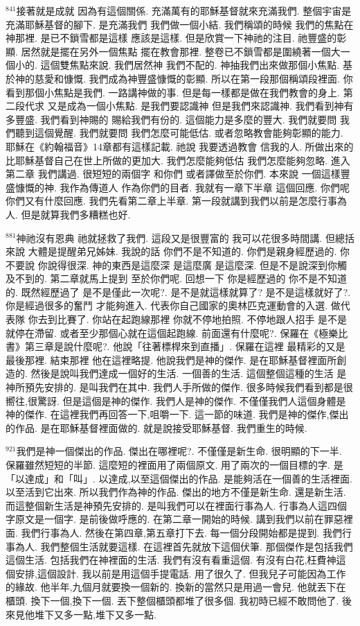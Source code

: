 \documentclass{book}
\begin{document}
$^{841}$接著就是成就 因為有這個關係.
充滿萬有的耶穌基督就來充滿我們.
整個宇宙是充滿耶穌基督的腳下.
是充滿我們 我們做一個小結.
我們稱頌的時候 我們的焦點在神那裡.
是已不鎖雪都是這樣 應該是這樣.
但是欣賞一下神祂的注目.
祂豐盛的彰顯.
居然就是擺在另外一個焦點 擺在教會那裡.
整卷已不鎖雪都是圍繞著一個大一個小的.
這個雙焦點來說.
我們居然神 我們不配的.
神抽我們出來做那個小焦點.
基於神的慈愛和慷慨.
我們成為神豐盛慷慨的彰顯.
所以在第一段那個稱頌段裡面.
你看到那個小焦點是我們.
一路講神做的事.
但是每一樣都是做在我們教會的身上.
第二段代求 又是成為一個小焦點.
是我們要認識神 但是我們來認識神.
我們看到神有多豐盛.
我們看到神賜的 賜給我們有份的.
這個能力是多麼的豐大.
我們就要問 我們聽到這個覺醒.
我們就要問 我們怎麼可能低估.
或者忽略教會能夠彰顯的能力.
耶穌在《約翰福音》14章都有這樣記載.
祂說 我要透過教會 信我的人.
所做出來的 比耶穌基督自己在世上所做的更加大.
我們怎麼能夠低估 我們怎麼能夠忽略.
進入第二章 我們講過.
很短短的兩個字 和你們 或者譯做至於你們.
本來說 一個這樣豐盛慷慨的神.
我作為傳道人 作為你們的目者.
我就有一章下半章 這個回應.
你們呢 你們又有什麼回應.
我們先看第二章上半章.
第一段就講到我們以前是怎麼行事為人.
但是就算我們多糟糕也好.

$^{881}$神祂沒有恩典 祂就拯救了我們.
這段又是很豐富的 我可以花很多時間講.
但總括來說 大體是提醒弟兄姊妹.
我說的話 你們不是不知道的.
你們是親身經歷過的.
你不要說 你說得很深.
神的東西是這麼深 是這麼廣 是這麼深.
但是不是說深到你觸及不到的.
第二章就馬上提到 至於你們呢.
回想一下 你是經歷過的 你不是不知道的.
既然經歷過了 是不是僅此一次呢?.
是不是就這樣就算了? 是不是這樣就好了?.
你是經過很多的奮鬥 才能夠進入.
代表你自己國家的奧林匹克運動會的入選.
做代表隊 你去到比賽了.
你站在起跑線那裡 你就不停地拍照.
不停地跟人招手 是不是就停在滯留.
或者至少那個心就在這個起跑線.
前面還有什麼呢?.
保羅在《極樂比書》第三章是說什麼呢?.
他說「往著標桿來到直播」.
保羅在這裡 最精彩的又是最後那裡.
結束那裡 他在這裡略提.
他說我們是神的傑作.
是在耶穌基督裡面所創造的.
然後是說叫我們達成一個好的生活.
一個善的生活.
這個整個這種的生活 是神所預先安排的.
是叫我們在其中.
我們人手所做的傑作.
很多時候我們看到都是很嚮往,很驚訝.
但是這個是神的傑作.
我們人是神的傑作.
不僅僅我們人這個身體是神的傑作.
在這裡我們再回答一下,咀嚼一下.
這一節的味道.
我們是神的傑作,傑出的作品.
是在耶穌基督裡面做的.
就是說接受耶穌基督.
我們重生的時候.

$^{921}$我們是神一個傑出的作品.
傑出在哪裡呢?.
不僅僅是新生命.
很明顯的下一半.
保羅雖然短短的半節.
這麼短的裡面用了兩個原文.
用了兩次的一個目標的字.
是「以達成」和「叫」.
以達成,以至這個傑出的作品.
是能夠活在一個善的生活裡面.
以至活到它出來.
所以我們作為神的作品.
傑出的地方不僅是新生命.
還是新生活.
而這整個新生活是神預先安排的.
是叫我們可以在裡面行事為人.
行事為人這四個字原文是一個字.
是前後做呼應的.
在第二章一開始的時候.
講到我們以前在罪惡裡面.
我們行事為人.
然後在第四章,第五章打下去.
每一個分段開始都是提到.
我們行事為人.
我們整個生活就要這樣.
在這裡首先就放下這個伏筆.
那個傑作是包括我們這個生活.
包括我們在神裡面的生活.
我們有沒有看重這個.
有沒有白花,枉費神這個安排,這個設計.
我以前是用這個手提電話.
用了很久了.
但我兒子可能因為工作的緣故.
他半年,九個月就要換一個新的.
換新的當然只是用過一會兒.
他就丟下在櫃頭.
換下一個,換下一個.
丟下整個櫃頭都堆了很多個.
我初時已經不敢問他了.
後來見他堆下又多一點,堆下又多一點.
\end{document}
